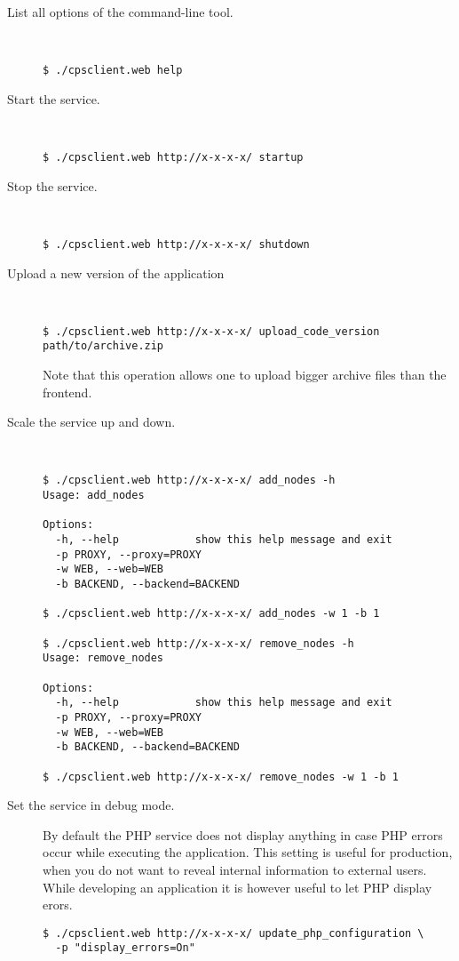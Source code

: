 \documentclass[10pt]{article}
\begin{document}
\begin{description}
\item[List all options of the command-line tool.]~
\begin{verbatim}
$ ./cpsclient.web help
\end{verbatim}

\item[Start the service.]~
\begin{verbatim}
$ ./cpsclient.web http://x-x-x-x/ startup
\end{verbatim}

\item[Stop the service.]~
\begin{verbatim}
$ ./cpsclient.web http://x-x-x-x/ shutdown
\end{verbatim}

\item[Upload a new version of the application]~
\begin{verbatim}
$ ./cpsclient.web http://x-x-x-x/ upload_code_version path/to/archive.zip
\end{verbatim}
Note that this operation allows one to upload bigger archive files than the frontend.

\item[Scale the service up and down.]~
\begin{verbatim}
$ ./cpsclient.web http://x-x-x-x/ add_nodes -h
Usage: add_nodes

Options:
  -h, --help            show this help message and exit
  -p PROXY, --proxy=PROXY
  -w WEB, --web=WEB     
  -b BACKEND, --backend=BACKEND

$ ./cpsclient.web http://x-x-x-x/ add_nodes -w 1 -b 1

$ ./cpsclient.web http://x-x-x-x/ remove_nodes -h
Usage: remove_nodes

Options:
  -h, --help            show this help message and exit
  -p PROXY, --proxy=PROXY
  -w WEB, --web=WEB     
  -b BACKEND, --backend=BACKEND

$ ./cpsclient.web http://x-x-x-x/ remove_nodes -w 1 -b 1
\end{verbatim}

\item[Set the service in debug mode.] By default the PHP service does
  not display anything in case PHP errors occur while executing the
  application. This setting is useful for production, when you do not
  want to reveal internal information to external users. While
  developing an application it is however useful to let PHP display
  erors.
\begin{verbatim}
$ ./cpsclient.web http://x-x-x-x/ update_php_configuration \
  -p "display_errors=On" 
\end{verbatim}
\end{description}
\end{document}

